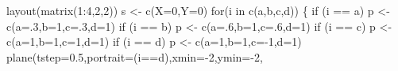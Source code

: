 \documentclass[
  a4paper,
  DIV=11,
  numbers=noendperiod,
  oneside]{scrreprt}
\newenvironment{Shaded}{}{}
\newcommand{\AttributeTok}[1]{\textcolor[rgb]{0.84,0.23,0.29}{#1}}
\newcommand{\ControlFlowTok}[1]{\textcolor[rgb]{0.84,0.23,0.29}{#1}}
\newcommand{\DecValTok}[1]{\textcolor[rgb]{0.00,0.36,0.77}{#1}}
\newcommand{\FloatTok}[1]{\textcolor[rgb]{0.00,0.36,0.77}{#1}}
\newcommand{\FunctionTok}[1]{\textcolor[rgb]{0.44,0.26,0.76}{#1}}
\newcommand{\NormalTok}[1]{\textcolor[rgb]{0.14,0.16,0.18}{#1}}
\newcommand{\OtherTok}[1]{\textcolor[rgb]{0.44,0.26,0.76}{#1}}
\newcommand{\SpecialCharTok}[1]{\textcolor[rgb]{0.00,0.36,0.77}{#1}}
\newcommand{\StringTok}[1]{\textcolor[rgb]{0.01,0.18,0.38}{#1}}
\begin{document}
\begin{Shaded}
\begin{Highlighting}[]
\FunctionTok{layout}\NormalTok{(}\FunctionTok{matrix}\NormalTok{(}\DecValTok{1}\SpecialCharTok{:}\DecValTok{4}\NormalTok{,}\DecValTok{2}\NormalTok{,}\DecValTok{2}\NormalTok{))}
\NormalTok{s }\OtherTok{\textless{}{-}} \FunctionTok{c}\NormalTok{(}\AttributeTok{X=}\DecValTok{0}\NormalTok{,}\AttributeTok{Y=}\DecValTok{0}\NormalTok{) }
\ControlFlowTok{for}\NormalTok{(i }\ControlFlowTok{in} \FunctionTok{c}\NormalTok{(}\StringTok{\textquotesingle{}a\textquotesingle{}}\NormalTok{,}\StringTok{\textquotesingle{}b\textquotesingle{}}\NormalTok{,}\StringTok{\textquotesingle{}c\textquotesingle{}}\NormalTok{,}\StringTok{\textquotesingle{}d\textquotesingle{}}\NormalTok{))}
\NormalTok{\{}
  \ControlFlowTok{if}\NormalTok{ (i }\SpecialCharTok{==} \StringTok{\textquotesingle{}a\textquotesingle{}}\NormalTok{) p }\OtherTok{\textless{}{-}} \FunctionTok{c}\NormalTok{(}\AttributeTok{a=}\NormalTok{.}\DecValTok{3}\NormalTok{,}\AttributeTok{b=}\DecValTok{1}\NormalTok{,}\AttributeTok{c=}\NormalTok{.}\DecValTok{3}\NormalTok{,}\AttributeTok{d=}\DecValTok{1}\NormalTok{)}
  \ControlFlowTok{if}\NormalTok{ (i }\SpecialCharTok{==} \StringTok{\textquotesingle{}b\textquotesingle{}}\NormalTok{) p }\OtherTok{\textless{}{-}} \FunctionTok{c}\NormalTok{(}\AttributeTok{a=}\NormalTok{.}\DecValTok{6}\NormalTok{,}\AttributeTok{b=}\DecValTok{1}\NormalTok{,}\AttributeTok{c=}\NormalTok{.}\DecValTok{6}\NormalTok{,}\AttributeTok{d=}\DecValTok{1}\NormalTok{)}
  \ControlFlowTok{if}\NormalTok{ (i }\SpecialCharTok{==} \StringTok{\textquotesingle{}c\textquotesingle{}}\NormalTok{) p }\OtherTok{\textless{}{-}} \FunctionTok{c}\NormalTok{(}\AttributeTok{a=}\DecValTok{1}\NormalTok{,}\AttributeTok{b=}\DecValTok{1}\NormalTok{,}\AttributeTok{c=}\DecValTok{1}\NormalTok{,}\AttributeTok{d=}\DecValTok{1}\NormalTok{)}
  \ControlFlowTok{if}\NormalTok{ (i }\SpecialCharTok{==} \StringTok{\textquotesingle{}d\textquotesingle{}}\NormalTok{) p }\OtherTok{\textless{}{-}} \FunctionTok{c}\NormalTok{(}\AttributeTok{a=}\DecValTok{1}\NormalTok{,}\AttributeTok{b=}\DecValTok{1}\NormalTok{,}\AttributeTok{c=}\SpecialCharTok{{-}}\DecValTok{1}\NormalTok{,}\AttributeTok{d=}\DecValTok{1}\NormalTok{)}
  \FunctionTok{plane}\NormalTok{(}\AttributeTok{tstep=}\FloatTok{0.5}\NormalTok{,}\AttributeTok{portrait=}\NormalTok{(i}\SpecialCharTok{==}\StringTok{\textquotesingle{}d\textquotesingle{}}\NormalTok{),}\AttributeTok{xmin=}\SpecialCharTok{{-}}\DecValTok{2}\NormalTok{,}\AttributeTok{ymin=}\SpecialCharTok{{-}}\DecValTok{2}\NormalTok{,}

\end{Highlighting}
\end{Shaded}
\end{document}
